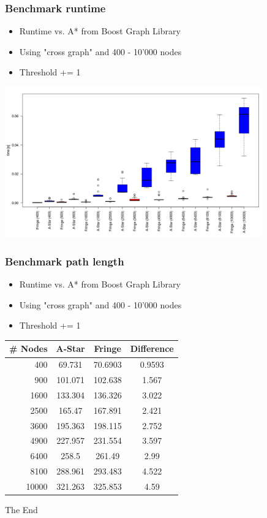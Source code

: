 \documentclass{beamer}
\begin{document}
\begin{frame}
\frametitle{Benchmark runtime}
\begin{itemize}
\item Runtime vs. A* from Boost Graph Library
\item Using "cross graph" and 400 - 10'000 nodes
\item Threshold += 1
\end{itemize}
\begin{center}
	\includegraphics[height=184pt]{boxplot.png}
\end{center}
\end{frame}

\begin{frame}
\frametitle{Benchmark path length}
\begin{itemize}
\item Runtime vs. A* from Boost Graph Library
\item Using "cross graph" and 400 - 10'000 nodes
\item Threshold += 1
\end{itemize}
\begin{center}
    \begin{tabular}{ | r | c | c | c |}
    \hline
\# \textbf{Nodes}	&	\textbf{A-Star}	&	\textbf{Fringe}	&	\textbf{Difference} \\ \hline
400		&	69.731	&	70.6903	&	0.9593 \\ \hline
900		&	101.071	&	102.638	&	1.567 \\ \hline
1600		&	133.304	&	136.326	&	3.022 \\ \hline
2500		&	165.47	&	167.891	&	2.421 \\ \hline
3600		&	195.363	&	198.115	&	2.752 \\ \hline
4900		&	227.957	&	231.554	&	3.597 \\ \hline
6400		&	258.5	&	261.49	&	2.99 \\ \hline
8100		&	288.961	&	293.483	&	4.522 \\ \hline
10000	&	321.263	&	325.853	&	4.59 \\ \hline
    \end{tabular}
\end{center}


\end{frame}



\begin{frame}
\Huge{\centerline{The End}}
\end{frame}

\end{document}
